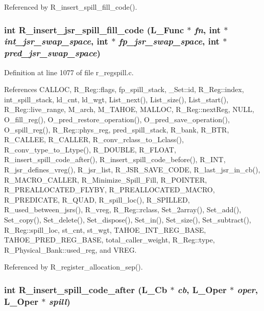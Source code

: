 Referenced by R\_\-insert\_\-spill\_\-fill\_\-code().
\subsubsection{\setlength{\rightskip}{0pt plus 5cm}int R\_\-insert\_\-jsr\_\-spill\_\-fill\_\-code (L\_\-Func $\ast$ {\em fn}, int $\ast$ {\em int\_\-jsr\_\-swap\_\-space}, int $\ast$ {\em fp\_\-jsr\_\-swap\_\-space}, int $\ast$ {\em pred\_\-jsr\_\-swap\_\-space})}\label{r__regspill_8c_e8e1bc7ebb045aa975a3d459b9f8cca0}




Definition at line 1077 of file r\_\-regspill.c.

References CALLOC, R\_\-Reg::flags, fp\_\-spill\_\-stack, \_\-Set::id, R\_\-Reg::index, int\_\-spill\_\-stack, ld\_\-cnt, ld\_\-wgt, List\_\-next(), List\_\-size(), List\_\-start(), R\_\-Reg::live\_\-range, M\_\-arch, M\_\-TAHOE, MALLOC, R\_\-Reg::next\-Reg, NULL, O\_\-fill\_\-reg(), O\_\-pred\_\-restore\_\-operation(), O\_\-pred\_\-save\_\-operation(), O\_\-spill\_\-reg(), R\_\-Reg::phys\_\-reg, pred\_\-spill\_\-stack, R\_\-bank, R\_\-BTR, R\_\-CALLEE, R\_\-CALLER, R\_\-conv\_\-rclass\_\-to\_\-Lclass(), R\_\-conv\_\-type\_\-to\_\-Ltype(), R\_\-DOUBLE, R\_\-FLOAT, R\_\-insert\_\-spill\_\-code\_\-after(), R\_\-insert\_\-spill\_\-code\_\-before(), R\_\-INT, R\_\-jsr\_\-defines\_\-vreg(), R\_\-jsr\_\-list, R\_\-JSR\_\-SAVE\_\-CODE, R\_\-last\_\-jsr\_\-in\_\-cb(), R\_\-MACRO\_\-CALLER, R\_\-Minimize\_\-Spill\_\-Fill, R\_\-POINTER, R\_\-PREALLOCATED\_\-FLYBY, R\_\-PREALLOCATED\_\-MACRO, R\_\-PREDICATE, R\_\-QUAD, R\_\-spill\_\-loc(), R\_\-SPILLED, R\_\-used\_\-between\_\-jsrs(), R\_\-vreg, R\_\-Reg::rclass, Set\_\-2array(), Set\_\-add(), Set\_\-copy(), Set\_\-delete(), Set\_\-dispose(), Set\_\-in(), Set\_\-size(), Set\_\-subtract(), R\_\-Reg::spill\_\-loc, st\_\-cnt, st\_\-wgt, TAHOE\_\-INT\_\-REG\_\-BASE, TAHOE\_\-PRED\_\-REG\_\-BASE, total\_\-caller\_\-weight, R\_\-Reg::type, R\_\-Physical\_\-Bank::used\_\-reg, and VREG.

Referenced by R\_\-register\_\-allocation\_\-sep().
\subsubsection{\setlength{\rightskip}{0pt plus 5cm}int R\_\-insert\_\-spill\_\-code\_\-after (L\_\-Cb $\ast$ {\em cb}, L\_\-Oper $\ast$ {\em oper}, L\_\-Oper $\ast$ {\em spill})}\label{r__regspill_8c_0f3f5aec000f08fc43f41acf49f12abd}




